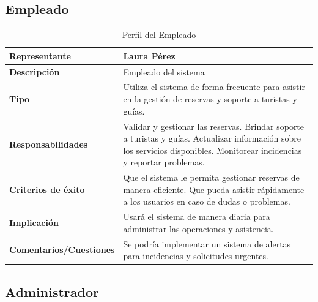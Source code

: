 \subsection*{Empleado}

\begin{table}[H]
\centering
\begin{tabular}{|p{5cm}|p{10cm}|}
\hline
\rowcolor[HTML]{CFE2F3} 
\textbf{Representante} & Laura Pérez \\ \hline
\textbf{Descripción} & Empleado del sistema \\ \hline
\textbf{Tipo} & Utiliza el sistema de forma frecuente para asistir en la gestión de reservas y soporte a turistas y guías. \\ \hline
\textbf{Responsabilidades} & Validar y gestionar las reservas. Brindar soporte a turistas y guías. Actualizar información sobre los servicios disponibles. Monitorear incidencias y reportar problemas. \\ \hline
\textbf{Criterios de éxito} & Que el sistema le permita gestionar reservas de manera eficiente. Que pueda asistir rápidamente a los usuarios en caso de dudas o problemas. \\ \hline
\textbf{Implicación} & Usará el sistema de manera diaria para administrar las operaciones y asistencia. \\ \hline
\textbf{Comentarios/Cuestiones} & Se podría implementar un sistema de alertas para incidencias y solicitudes urgentes. \\ \hline
\end{tabular}
\caption{Perfil del Empleado}
\label{tab:perfil_empleado}
\end{table}


\subsection*{Administrador}

